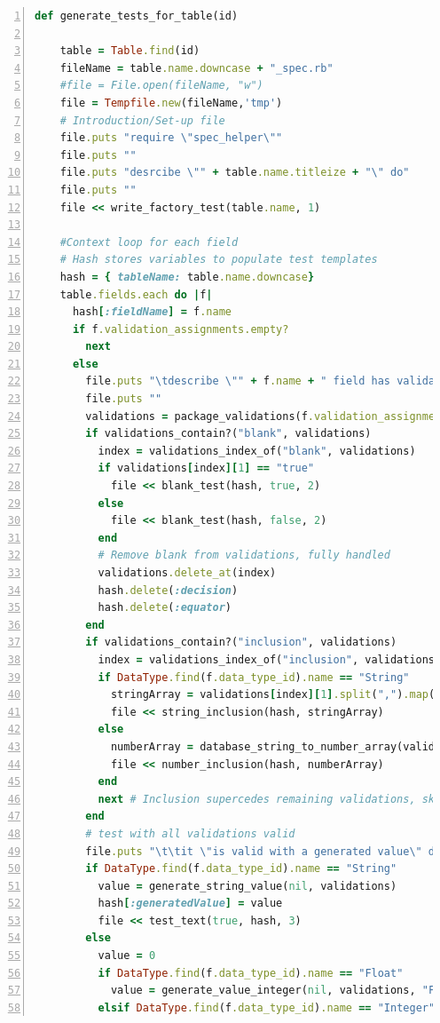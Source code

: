 \documentclass[a4paper,12pt]{article}
\begin{document}
\begin{lstlisting}[frame=single,numbers=left,language = ruby,caption= {generate\_tests\_for\_table}, label={code:bigboy}]
def generate_tests_for_table(id)

    table = Table.find(id)
    fileName = table.name.downcase + "_spec.rb"
    #file = File.open(fileName, "w")
    file = Tempfile.new(fileName,'tmp')
    # Introduction/Set-up file
    file.puts "require \"spec_helper\""
    file.puts ""
    file.puts "desrcibe \"" + table.name.titleize + "\" do"
    file.puts ""
    file << write_factory_test(table.name, 1)

    #Context loop for each field
    # Hash stores variables to populate test templates
    hash = { tableName: table.name.downcase}
    table.fields.each do |f|
      hash[:fieldName] = f.name
      if f.validation_assignments.empty?
        next 
      else
        file.puts "\tdescribe \"" + f.name + " field has validation\" do"
        file.puts ""
        validations = package_validations(f.validation_assignments)
        if validations_contain?("blank", validations)
          index = validations_index_of("blank", validations)
          if validations[index][1] == "true"
            file << blank_test(hash, true, 2)
          else
            file << blank_test(hash, false, 2)
          end
          # Remove blank from validations, fully handled
          validations.delete_at(index)
          hash.delete(:decision)
          hash.delete(:equator)
        end
        if validations_contain?("inclusion", validations)
          index = validations_index_of("inclusion", validations)
          if DataType.find(f.data_type_id).name == "String"
            stringArray = validations[index][1].split(",").map(&:strip)
            file << string_inclusion(hash, stringArray)
          else
            numberArray = database_string_to_number_array(validations[index][1])
            file << number_inclusion(hash, numberArray)
          end
          next # Inclusion supercedes remaining validations, skip to next
        end
        # test with all validations valid
        file.puts "\t\tit \"is valid with a generated value\" do\n"
        if DataType.find(f.data_type_id).name == "String"          
          value = generate_string_value(nil, validations)
          hash[:generatedValue] = value
          file << test_text(true, hash, 3)
        else
          value = 0
          if DataType.find(f.data_type_id).name == "Float"
            value = generate_value_integer(nil, validations, "Float")
          elsif DataType.find(f.data_type_id).name == "Integer"

\end{lstlisting}
\end{document}

